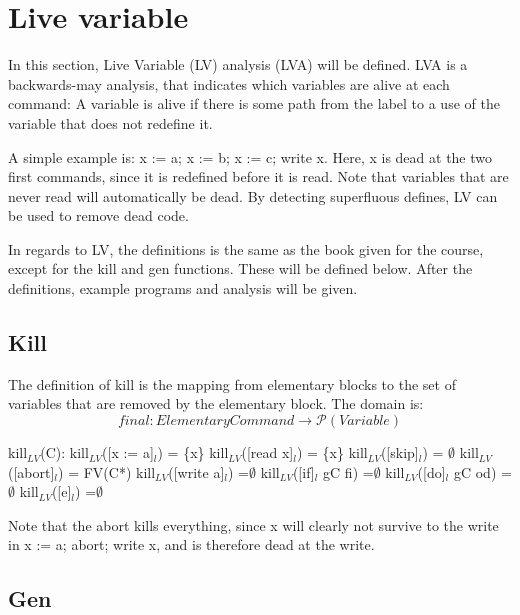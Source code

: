 
\section{Live variable}
In this section, Live Variable (LV) analysis (LVA) will be defined.
LVA is a backwards-may analysis, that indicates which variables are
alive at each command: A variable is alive if there is some path
from the label to a use of the variable that does not redefine it.

  A simple example is: x := a; x := b; x := c; write x.
Here, x is dead at the two first commands, since it is redefined
before it is read. Note that variables that are never read will
automatically be dead. By detecting superfluous defines, LV
can be used to remove dead code.

In regards to LV, the definitions is the same as the book given for the course,
except for the kill and gen functions. These will be defined below.
After the definitions, example programs and analysis will be given.

\subsection{Kill}

The definition of kill is the mapping from elementary blocks to the set of variables
that are removed by the elementary block. The domain is:
\[final \colon Elementary Command \to \mathcal{P}(Variable)\]

\docpar
kill$_{LV}$(C):\newline
kill$_{LV}$([x := a]$_l$)           = \{x\}
kill$_{LV}$([read x]$_l$)           = \{x\}
kill$_{LV}$([skip]$_l$)             = $\emptyset$\newline
kill$_{LV}$([abort]$_l$) 			= FV(C*)\newline
kill$_{LV}$([write a]$_l$)          =$\emptyset$\newline
kill$_{LV}$([if]$_l$ gC fi)         =$\emptyset$\newline
kill$_{LV}$([do]$_l$ gC od)         =$\emptyset$\newline
kill$_{LV}$([e]$_l$)                =$\emptyset$\newline

Note that the abort kills everything, since x will clearly not survive to the write in
x := a; abort; write x, and is therefore dead at the write.

\subsection{Gen}

